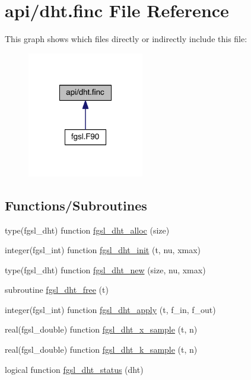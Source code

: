 \hypertarget{dht_8finc}{\section{api/dht.finc File Reference}
\label{dht_8finc}
}
This graph shows which files directly or indirectly include this file\-:\nopagebreak
\begin{figure}[H]
\begin{center}
\leavevmode
\includegraphics[width=144pt]{dht_8finc__dep__incl}
\end{center}
\end{figure}
\subsection*{Functions/\-Subroutines}
\begin{DoxyCompactItemize}
\item 
type(fgsl\-\_\-dht) function \hyperlink{dht_8finc_afb86f7c8f57dc3d670480fedf967ecd4}{fgsl\-\_\-dht\-\_\-alloc} (size)
\item 
integer(fgsl\-\_\-int) function \hyperlink{dht_8finc_abb2bcd0254c3b7209be2be3e92ff3fa6}{fgsl\-\_\-dht\-\_\-init} (t, nu, xmax)
\item 
type(fgsl\-\_\-dht) function \hyperlink{dht_8finc_adea7d327ef1817dee38b9425de98585b}{fgsl\-\_\-dht\-\_\-new} (size, nu, xmax)
\item 
subroutine \hyperlink{dht_8finc_ae26b17e9d3a3a0e428ace07554351086}{fgsl\-\_\-dht\-\_\-free} (t)
\item 
integer(fgsl\-\_\-int) function \hyperlink{dht_8finc_a587dbba2d2d50e3e07d1f4ba1a7a1989}{fgsl\-\_\-dht\-\_\-apply} (t, f\-\_\-in, f\-\_\-out)
\item 
real(fgsl\-\_\-double) function \hyperlink{dht_8finc_af6b6534c16d8cfcfaeae9ea4ea9fa3c4}{fgsl\-\_\-dht\-\_\-x\-\_\-sample} (t, n)
\item 
real(fgsl\-\_\-double) function \hyperlink{dht_8finc_ab0250953195cfe60a32a5c5d532fdf75}{fgsl\-\_\-dht\-\_\-k\-\_\-sample} (t, n)
\item 
logical function \hyperlink{dht_8finc_a58dc6a67e94415bb013e635effcefa24}{fgsl\-\_\-dht\-\_\-status} (dht)
\end{DoxyCompactItemize}


